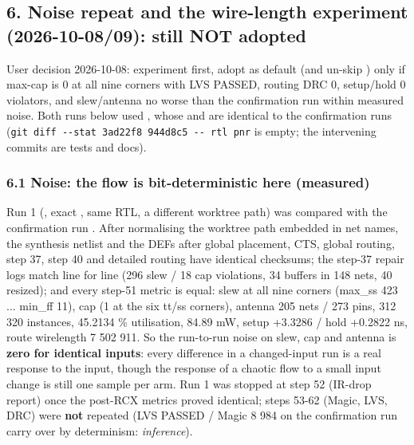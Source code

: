 \subsection{\texorpdfstring{6. Noise repeat and the wire-length
experiment (2026-10-08/\allowbreak{}09): still NOT
adopted}{6. Noise repeat and the wire-length experiment (2026-10-08/09): still NOT adopted}}\label{cr:defect:sky130-slew-cap-e45j:6-noise-repeat-and-the-wire-length-experiment-2026-10-0809-still-not-adopted}

\begin{record}

User decision 2026-10-08: experiment first, adopt  as
default (and un-skip ) only if max-cap is
0 at all nine corners with LVS PASSED, routing DRC 0,
setup/\allowbreak{}hold 0 violators, and slew/\allowbreak{}antenna no
worse than the confirmation run within measured noise. Both runs below
used  , whose  and 
are identical to the confirmation run\textquotesingle s 
(\texttt{git\ diff\ -\allowbreak{}-\allowbreak{}stat\ 3ad22f8\ 944d8c5\ -\allowbreak{}-\allowbreak{}\ rtl\ pnr}
is empty; the intervening commits are tests and docs).

\end{record}

\subsubsection{6.1 Noise: the flow is bit-deterministic here (measured)}\label{cr:defect:sky130-slew-cap-e45j:61-noise-the-flow-is-bit-deterministic-here-measured}

\begin{record}

Run 1 (, exact ,
same RTL, a different worktree path) was compared with the confirmation
run . After normalising the worktree path
embedded in net names, the synthesis netlist and the DEFs after global
placement, CTS, global routing, step 37, step 40 and detailed routing
have identical checksums; the step-37 repair logs match line for line
(296 slew / 18 cap violations, 34 buffers in 148 nets, 40 resized); and
every step-51 metric is equal: slew at all nine corners (max\_ss 423 ...
min\_ff 11), cap (1 at the six tt/ss corners), antenna 205 nets / 273
pins, 312 320 instances, 45.2134 \% utilisation, 84.89 mW, setup +3.3286
/ hold +0.2822 ns, route wirelength 7 502 911. So the run-to-run noise
on slew, cap and antenna is \textbf{zero for identical inputs}: every
difference in a changed-input run is a real response to the input,
though the response of a chaotic flow to a small input change is still
one sample per arm. Run 1 was stopped at step 52 (IR-drop report) once
the post-RCX metrics proved identical; steps 53-62 (Magic, LVS, DRC)
were \textbf{not} repeated (LVS PASSED / Magic 8 984 on the confirmation
run carry over by determinism: \emph{inference}).

\end{record}

